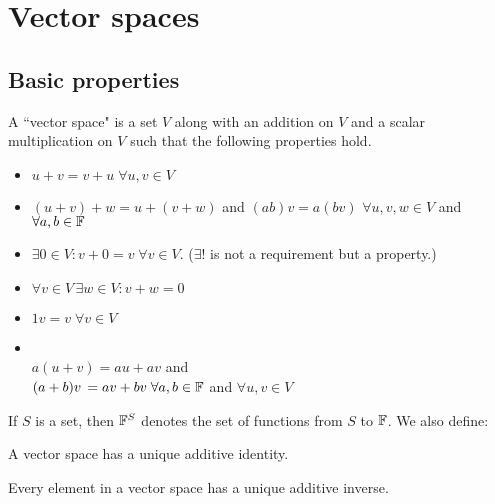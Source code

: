 \chapter{Vector spaces}

\section{Basic properties}

\setcounter{thm}{19}
\begin{mydef}
    A ``vector space" is a set $V$ along with an addition on $V$ and a scalar multiplication on $V$ such that the following properties hold.
    \begin{itemize}
        \item {} 
        $ u+v = v+u \; \forall u,v \in V$
        \item {} 
        $(u+v)+w=u+(v+w)$ and $(ab)v=a(bv)$ $\forall u,v,w \in V$ and $\forall a,b \in {\mathbb{F}}$
        \item {} 
        $\exists 0\in V:v+0=v \; \forall v\in V$. ($\exists!$ is not a requirement but a property.)
        \item {} 
        $\forall v\in V \, \exists w\in V: v+w=0$
        \item {} 
        $1v = v \; \forall v\in V$
        \item {}\\
        $a(u+v) = au+av$ and  \\
        $(a+b)v \, = av + bv \; \forall a,b \in {\mathbb{F}}$ and 
        $\forall u,v \in V$
    \end{itemize}
\end{mydef}

\setcounter{thm}{23}
\begin{mydef}
    If $S$ is a set, then ${\mathbb{F}}^S$ denotes the set of functions from $S$ to ${\mathbb{F}}$. We also define:
\end{mydef}

\setcounter{thm}{25}
\begin{thm}
    A vector space has a unique additive identity.
\end{thm}

\begin{thm}
    Every element in a vector space has a unique additive inverse.
\end{thm}

